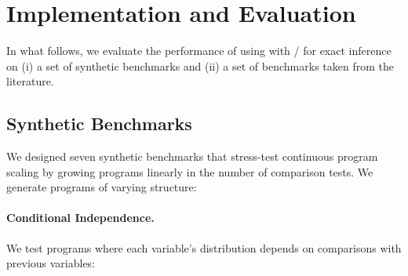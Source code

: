 \section{Implementation and Evaluation}\label{sec:implem_eval}




In what follows, we evaluate the performance of using \Slice{} with \Dice{}/\Roulette{} for exact inference on (i) a set of synthetic benchmarks and (ii) a set of benchmarks taken from the literature.

\subsection{Synthetic Benchmarks}\label{sec:synthetic-benchmarks}
We designed seven synthetic benchmarks that stress-test continuous program scaling by growing programs linearly in the number of comparison tests. We generate programs of varying structure:

\paragraph{Conditional Independence.} 
We test programs where each variable's distribution depends on comparisons with previous variables:

